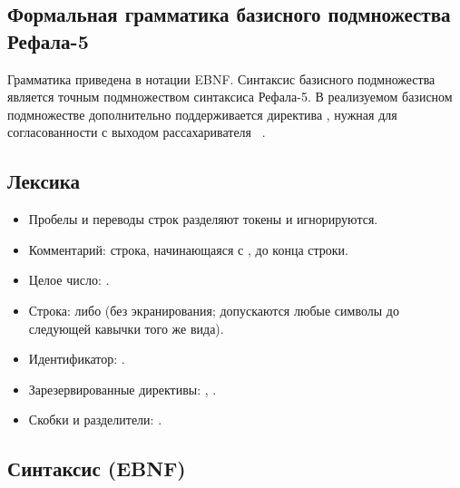 \clearpage

\label{app:grammar}

\subsection*{Формальная грамматика базисного подмножества Рефала-5}

Грамматика приведена в нотации EBNF. Синтаксис базисного подмножества является
точным подмножеством синтаксиса Рефала-5. В реализуемом базисном подмножестве дополнительно
поддерживается директива , нужная для согласованности с выходом
рассахаривателя ~\cite{refal5_framework_github}.

\subsection*{Лексика}

\begin{itemize}
  \item Пробелы и переводы строк разделяют токены и игнорируются.
  \item Комментарий: строка, начинающаяся с \prog{*}, до конца строки.
  \item Целое число: .
  \item Строка:  либо \prog{\textquotedbl\ldots\textquotedbl} (без экранирования; допускаются любые
        символы до следующей кавычки того же вида).
  \item Идентификатор: \prog{[A-Za-z.\_\$][A-Za-z0-9.\_\$\-]*}.
  \item Зарезервированные директивы: , .
  \item Скобки и разделители: \prog{\{ \} ( ) < > = ; ,}.
\end{itemize}

\subsection*{Синтаксис (EBNF)}

